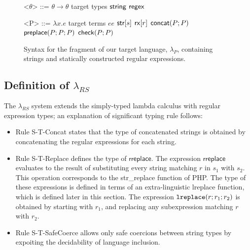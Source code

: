 \documentclass[9pt]{sig-alternate}
\theoremstyle{definition}
\newcommand{\lambdas}{\lambda_{RS}}
\newcommand{\lambdap}{\lambda_P}
\newcommand{\sisubst}[3]{{\sf rreplace}[#1](#2;#3)} \newcommand{\rreplace}[3]{{\sf rreplace}[#1](#2;#3)} %
\newcommand{\coerce}[2]{ {\sf rcoerce}[#1](#2)}
\newcommand{\sistr}[1]{{\sf rstr}[#1]}   \newcommand{\rstr}[1]{{\sf rstr}[#1]} %
\newcommand{\strin}[1]{\sistr{#1}}
\newcommand{\rsconcat}[2]{{\sf rconcat}(#1;#2)} \newcommand{\rconcat}[2]{{\sf rconcat}(#1;#2)} %
\newcommand{\stringin}[1]{{\sf stringin}[#1]}
\newcommand{\tcheck}[2]{{\sf check}(#1; #2)}
\renewcommand{\tstr}[1]{{{\sf str}[#1]}}
\newcommand{\preplace}[3]{{\sf preplace}(#1;#2;#3)}
\newcommand{\tconcat}[2]{{\sf concat}(#1;#2)} \newcommand{\concat}[2]{{\sf concat}(#1;#2)} %
\newcommand{\rx}[1]{ {\sf rx}[#1] }
\newcommand{\str}{{\sf string}}
\newcommand{\regex}{{\sf regex}}
\newcommand{\lreplace}[3]{{\tt lreplace}(#1; #2; #3)}
\begin{document}



\begin{figure}[h]
\begin{grammar}

<$\theta$> ::= $\theta \rightarrow \theta$ \hfill target types \alt
$\str$ \alt $\regex$


<P> ::= $\lambda x . e$ \hfill target terms \alt
  $e e$ \alt
  $\tstr{s}$ \alt
  $\rx{r}$ \alt
  $\tconcat{P}{P}$ \alt
  $\preplace{P}{P}{P}$ \alt
  $\tcheck{P}{P}$ 
  \end{grammar}
\caption{Syntax for the fragment of our target language, $\lambdap$, containing strings and statically constructed regular expressions.}
\label{fig:lcsSyntax}
\end{figure}

\subsection{Definition of $\lambdas$}

The $\lambdas$ system extends the simply-typed lambda calculus with regular
expression types; an explanation of significant typing rule follows:
\begin{itemize}
  \item Rule S-T-Concat states that the type of concatenated strings is 
    obtained by concatenating the regular expressions for each string.
  \item Rule S-T-Replace defines the type of $\textsf{rreplace}$. The expression $\textsf{rreplace}$
    evaluates to the result of substituting every string matching $r$ in $s_1$
    with $s_2$. This operation corresponds to the \textsf{str_replace} function of PHP.
    The type of these expressions is defined in terms of an extra-linguistic \textsf{lreplace}
    function, which is defined later in this section.
    The expression $\lreplace{r}{r_1}{r_2}$ is obtained by
    starting with $r_1$, and replacing any subexpression matching $r$ with $r_2$.
  \item Rule S-T-SafeCoerce allows only safe coercions between string types by
    expoiting the decidability of language inclusion.
\end{itemize}
\end{document}
